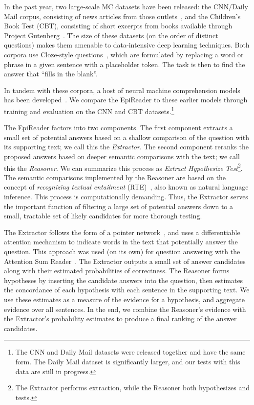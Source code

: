 \documentclass[11pt,letterpaper]{article}
\begin{document}
In the past year, two large-scale MC datasets have been released: the CNN/Daily Mail corpus, consisting of news articles from those outlets~\cite{hermann2015}, and the Children's Book Test (CBT), consisting of short excerpts from books available through Project Gutenberg~\cite{hill2015}. The size of these datasets (on the order of  distinct questions) makes them amenable to data-intensive deep learning techniques. Both corpora use Cloze-style questions~\cite{taylor1953}, which are formulated by replacing a word or phrase in a given sentence with a placeholder token. The task is then to find the answer that ``fills in the blank''.

In tandem with these corpora, a host of neural machine comprehension models has been developed~\cite{weston2014,hermann2015,hill2015,kadlec2016,chen2016}. We compare the EpiReader to these earlier models through training and evaluation on the CNN and CBT datasets.\footnote{The CNN and Daily Mail datasets were released together and have the same form. The Daily Mail dataset is significantly larger, and our tests with this data are still in progress.}

The EpiReader factors into two components. The first component extracts a small set of potential answers based on a shallow comparison of the question with its supporting text; we call this the \emph{Extractor}. The second component reranks the proposed answers based on deeper semantic comparisons with the text; we call this the \emph{Reasoner}.
We can summarize this process as \textsl{Extract}  \textsl{Hypothesize}  \textsl{Test}\footnote{The Extractor performs extraction, while the Reasoner both hypothesizes and tests.}.
The semantic comparisons implemented by the Reasoner are based on the concept of {\it recognizing textual entailment} (RTE)~\cite{dagan2006}, also known as natural language inference. This process is computationally demanding. Thus, the Extractor serves the important function of filtering a large set of potential answers down to a small, tractable set of likely candidates for more thorough testing.

The Extractor follows the form of a pointer network~\cite{vinyals2015}, and uses a differentiable attention mechanism to indicate words in the text that potentially answer the question. This approach was used (on its own) for question answering with the Attention Sum Reader~\cite{kadlec2016}. The Extractor outputs a small set of answer candidates along with their estimated probabilities of correctness. The Reasoner forms hypotheses by inserting the candidate answers into the question, then estimates the concordance of each hypothesis with each sentence in the supporting text. We use these estimates as a measure of the evidence for a hypothesis, and aggregate evidence over all sentences. In the end, we combine the Reasoner's evidence with the Extractor's probability estimates to produce a final ranking of the answer candidates.
\end{document}

